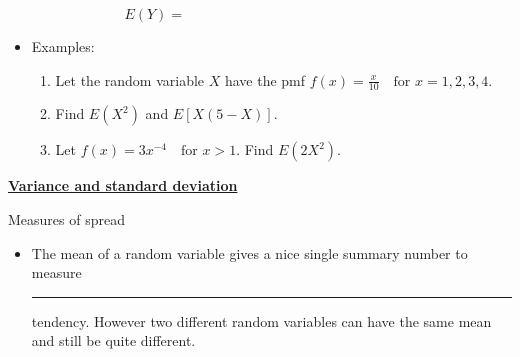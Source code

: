\documentclass{article}
\newcommand{\bu}[1]{\textbf{\ul{#1}}}				%
\newcommand{\blankul}[1]{\rule[-1.5mm]{#1}{0.15mm}}	%
\begin{document}
\begin{itemize}
    \[E(Y) = \hspace{200pt}\]\vspace{40pt}
    \item Examples:
    \begin{enumerate}
        \item Let the random variable $X$ have the pmf $f(x) = \frac{x}{10} \quad \text{for } x = 1, 2, 3, 4$.
        \item[] Find $E(X^2)$ and $E[X(5-X)]$.\vspace{80pt}
        \item Let $f(x) = 3x^{-4} \quad \text{for } x > 1$. Find $E(2X^2)$.\vspace{100pt}
    \end{enumerate}
\end{itemize}

\bu{Variance and standard deviation}\bigskip

Measures of spread\bigskip
\begin{itemize}
    \item The mean of a random variable gives a nice single summary number to measure \blankul{2.5cm} tendency. However two different random variables can have the same mean and still be quite different.\vspace{40pt}
\end{itemize}\bigskip
\end{document}
